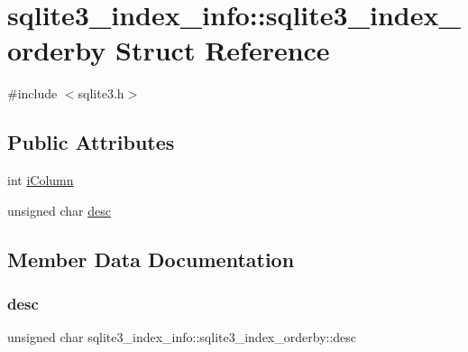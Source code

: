 \hypertarget{structsqlite3__index__info_1_1sqlite3__index__orderby}{}\section{sqlite3\+\_\+index\+\_\+info\+::sqlite3\+\_\+index\+\_\+orderby Struct Reference}
\label{structsqlite3__index__info_1_1sqlite3__index__orderby}


{\ttfamily \#include $<$sqlite3.\+h$>$}

\subsection*{Public Attributes}
\begin{DoxyCompactItemize}
\item 
int \mbox{\hyperlink{structsqlite3__index__info_1_1sqlite3__index__orderby_a266396085bfda9acef3f13eaa170cd2f}{i\+Column}}
\item 
unsigned char \mbox{\hyperlink{structsqlite3__index__info_1_1sqlite3__index__orderby_a0586d1b5d36221af96aeba8cfc56e9c6}{desc}}
\end{DoxyCompactItemize}


\subsection{Member Data Documentation}
\mbox{\label{structsqlite3__index__info_1_1sqlite3__index__orderby_a0586d1b5d36221af96aeba8cfc56e9c6}} 
\subsubsection{\texorpdfstring{desc}{desc}}
{\footnotesize\ttfamily unsigned char sqlite3\+\_\+index\+\_\+info\+::sqlite3\+\_\+index\+\_\+orderby\+::desc}

\mbox{\label{structsqlite3__index__info_1_1sqlite3__index__orderby_a266396085bfda9acef3f13eaa170cd2f}} 
